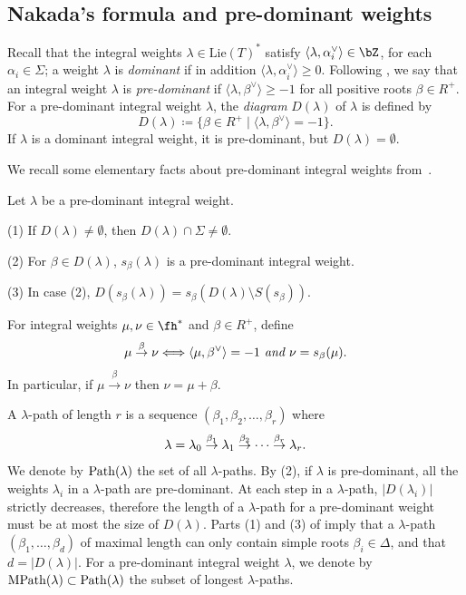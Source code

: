 \subsection{Nakada's formula and pre-dominant weights}\label{sec:predominant} Recall that the integral weights
$\lambda \in \mathrm{Lie}(T)^*$
satisfy 
$\langle\lambda,\alpha_i^\vee\rangle\in \bZ$, for each $\alpha_i \in \Sigma$; a weight $\lambda$ is {\em dominant} if in addition $\langle\lambda,\alpha_i^\vee\rangle\geq 0$. Following 
\cite{nakada:colored}, we say that an integral weight $\lambda$ is {\em pre-dominant} if
$\langle \lambda, \beta^\vee\rangle \geq -1$ for all positive roots $\beta \in R^{+}$. For a pre-dominant integral weight $\lambda$, the {\em diagram} $D(\lambda)$ of $\lambda$ is defined by
\begin{equation}\label{diagram}
	D(\lambda)\coloneqq \{\beta\in R^{+} \mid \langle\lambda, \beta^\vee\rangle =-1\}.
\end{equation}
\noindent
If $\lambda$ is a dominant integral weight, it is pre-dominant, but $D(\lambda)=\emptyset$. 

We recall some elementary facts about pre-dominant integral weights from~\cite{nakada:colored}. 
\begin{lemma}\label{lem:pre-dom}
	Let $\lambda$ be a pre-dominant integral weight. 
	
	
	(1) If $D(\lambda)\neq\emptyset$, then $D(\lambda) \cap \Sigma\neq \emptyset$.
	
	(2) For $\beta\in D(\lambda)$, $s_\beta(\lambda)$ is a pre-dominant integral weight.
	
	(3) In case (2), $D(s_\beta(\lambda))=s_\beta(D(\lambda)\setminus S(s_\beta))$.
\end{lemma}


For integral weights $\mu, \nu \in \fh^*$ and $\beta \in R^{+}$, define
\[\mu \overset{\beta}{\to} \nu \Longleftrightarrow \langle \mu, \beta^\vee\rangle=-1 \textit{ and } \nu=s_\beta(\mu) \/.\] In particular, if
$\mu \overset{\beta}{\to} \nu$ then $\nu = \mu + \beta$.

A $\lambda$-path of length $r$ is a sequence $(\beta_1,\beta_2,\ldots, \beta_r)$ where 
$$
\lambda=\lambda_0 \overset{\beta_1}{\to} \lambda_1 
\overset{\beta_2}{\to} \cdots
\overset{\beta_r}{\to} \lambda_r \/.
$$
We denote by ${\rm Path}(\lambda)$ the set of all $\lambda$-paths.
By (2), if $\lambda$ is pre-dominant, all the weights $\lambda_i$ in a $\lambda$-path are
pre-dominant. At each step in a $\lambda$-path, $|D(\lambda_i)|$ strictly decreases, therefore the 
length of a $\lambda$-path for a pre-dominant weight must be at most the size of $D(\lambda)$. 
Parts (1) and (3) of  imply that a $\lambda$-path $(\beta_1, \ldots, \beta_d)$ of maximal length can only contain simple roots $\beta_i \in \Delta$, and that $d = |D(\lambda)|$. For a pre-dominant integral weight $\lambda$, 
we denote by ${\rm MPath}(\lambda)\subset {\rm Path}(\lambda)$ the subset of longest $\lambda$-paths.

